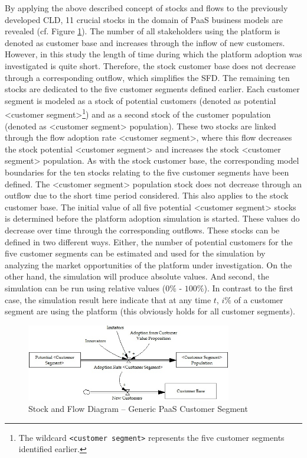 By applying the above described concept of stocks and flows to the previously developed \ac{CLD}, 11 crucial stocks in the domain of \ac{PaaS} business models are revealed (cf. Figure \ref{fig:sfd_cs}). The number of all stakeholders using the platform is denoted as customer base and increases through the inflow of new customers. However, in this study the length of time during which the platform adoption was investigated is quite short. Therefore, the stock customer base does not decrease through a corresponding outflow, which simplifies the \ac{SFD}. The remaining ten stocks are dedicated to the five customer segments defined earlier. Each customer segment is modeled as a stock of potential customers (denoted as potential <customer segment>\footnote{The wildcard \texttt{<customer segment>} represents the five customer segments identified earlier.}) and as a second stock of the customer population (denoted as <customer segment> population). These two stocks are linked through the flow adoption rate <customer segment>, where this flow decreases the stock potential <customer segment> and increases the stock <customer segment> population. As with the stock customer base, the corresponding model boundaries for the ten stocks relating to the five customer segments have been defined. The <customer segment> population stock does not decrease through an outflow due to the short time period considered. This also applies to the stock customer base. The initial value of all five potential <customer segment> stocks is determined before the platform adoption simulation is started. These values do decrease over time through the corresponding outflows. These stocks can be defined in two different ways. Either, the number of potential customers for the five customer segments can be estimated and used for the simulation by analyzing the market opportunities of the platform under investigation. On the other hand, the simulation will produce absolute values. And second, the simulation can be run using relative values ($0\%$ - $100\%$). In contrast to the first case, the simulation result here indicate that at any time $t$, $i\%$ of a customer segment are using the platform (this obviously holds for all customer segments).

\begin{figure}[tb]
	\centering
	\includegraphics[width=0.8\textwidth]{gfx/sfd_customerSegment}
	\caption{Stock and Flow Diagram -- Generic PaaS Customer Segment}
	\label{fig:sfd_cs}
\end{figure}

